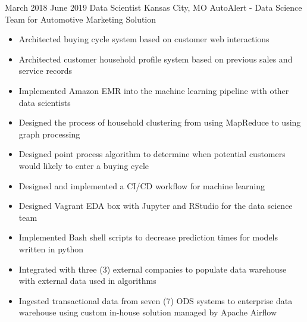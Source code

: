 \vspace*{0.05 in}

\ProjectExperience
{March 2018}
{June 2019}
{Data Scientist}
{Kansas City, MO}
{AutoAlert - Data Science Team for Automotive Marketing Solution}
{\begin{itemize}
    \item Architected buying cycle system based on customer web interactions
    \item Architected customer household profile system based on previous sales and service
    records
    \item Implemented Amazon EMR into the machine learning pipeline with other data scientists
\end{itemize}}
{\begin{itemize}
    \item Designed the process of household clustering from using MapReduce to using graph
    processing
    \item Designed point process algorithm to determine when potential customers would likely to
    enter a buying cycle
    \item Designed and implemented a CI/CD workflow for machine learning
    \item Designed Vagrant EDA box with Jupyter and RStudio for the data science team
\end{itemize}}
{\begin{itemize}
    \item Implemented Bash shell scripts to decrease prediction times for models written in python
    \item Integrated with three (3) external companies to populate data warehouse with external
    data used in algorithms
    \item Ingested transactional data from seven (7) ODS systems to enterprise data warehouse using
    custom in-house solution managed by Apache Airflow
\end{itemize}}